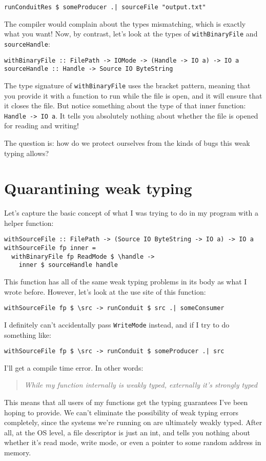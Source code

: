 \begin{verbatim}
runConduitRes $ someProducer .| sourceFile "output.txt"
\end{verbatim}
The compiler would complain about the types mismatching, which is exactly what you want! Now, by contrast, let's look at the types of \texttt{withBinaryFile} and \texttt{sourceHandle}:

\begin{verbatim}
withBinaryFile :: FilePath -> IOMode -> (Handle -> IO a) -> IO a
sourceHandle :: Handle -> Source IO ByteString
\end{verbatim}
The type signature of \texttt{withBinaryFile} uses the bracket pattern, meaning that you provide it with a function to run while the file is open, and it will ensure that it closes the file. But notice something about the type of that inner function: \texttt{Handle -> IO a}. It tells you absolutely nothing about whether the file is opened for reading and writing!

The question is: how do we protect ourselves from the kinds of bugs this weak typing allows?

\section{Quarantining weak typing}

Let's capture the basic concept of what I was trying to do in my program with a helper function:

\begin{verbatim}
withSourceFile :: FilePath -> (Source IO ByteString -> IO a) -> IO a
withSourceFile fp inner =
  withBinaryFile fp ReadMode $ \handle ->
    inner $ sourceHandle handle
\end{verbatim}
This function has all of the same weak typing problems in its body as what I wrote before. However, let's look at the use site of this function:

\begin{verbatim}
withSourceFile fp $ \src -> runConduit $ src .| someConsumer
\end{verbatim}
I definitely can't accidentally pass \texttt{WriteMode} instead, and if I try to do something like:

\begin{verbatim}
withSourceFile fp $ \src -> runConduit $ someProducer .| src
\end{verbatim}
I'll get a compile time error. In other words:
\begin{quotation}
 \textit{While my function internally is weakly typed, externally it's strongly typed }
\end{quotation}
This means that all users of my functions get the typing guarantees I've been hoping to provide. We can't eliminate the possibility of weak typing errors completely, since the systems we're running on are ultimately weakly typed. After all, at the OS level, a file descriptor is just an int, and tells you nothing about whether it's read mode, write mode, or even a pointer to some random address in memory.

